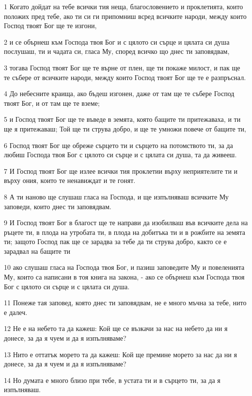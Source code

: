 \par 1 Когато дойдат на тебе всички тия неща, благословението и проклетията, които положих пред тебе, ако ти си ги припомниш всред всичките народи, между които Господ твоят Бог ще те изгони,
\par 2 и се обърнеш към Господа твоя Бог и с цялото си сърце и цялата си душа послушаш, ти и чадата си, гласа Му, според всичко що днес ти заповядвам,
\par 3 тогава Господ твоят Бог ще те върне от плен, ще ти покаже милост, и пак ще те събере от всичките народи, между които Господ твоят Бог ще те е разпръснал.
\par 4 До небесните краища, ако бъдеш изгонен, даже от там ще те събере Господ твоят Бог, и от там ще те вземе;
\par 5 и Господ твоят Бог ще те въведе в земята, която бащите ти притежаваха, и ти ще я притежаваш; Той ще ти струва добро, и ще те умножи повече от бащите ти,
\par 6 Господ твоят Бог ще обреже сърцето ти и сърцето на потомството ти, за да любиш Господа твоя Бог с цялото си сърце и с цялата си душа, та да живееш.
\par 7 И Господ твоят Бог ще излее всички тия проклетии върху неприятелите ти и върху ония, които те ненавиждат и те гонят.
\par 8 А ти наново ще слушаш гласа на Господа, и ще изпълняваш всичките Му заповеди, които днес ти заповядвам.
\par 9 И Господ твоят Бог в благост ще те направи да изобилваш във всичките дела на ръцете ти, в плода на утробата ти, в плода на добитъка ти и в рожбите на земята ти; защото Господ пак ще се зарадва за тебе да ти струва добро, както се е зарадвал на бащите ти
\par 10 ако слушаш гласа на Господа твоя Бог, и пазиш заповедите Му и повеленията Му, които са написани в тоя книга на закона, - ако се обърнеш към Господа твоя Бог с цялото си сърце и с цялата си душа.
\par 11 Понеже тая заповед, която днес ти заповядвам, не е много мъчна за тебе, нито е далеч.
\par 12 Не е на небето та да кажеш: Кой ще се възкачи за нас на небето да ни я донесе, за да я чуем и да я изпълняваме?
\par 13 Нито е оттатък морето та да кажеш: Кой ще премине морето за нас да ни я донесе, за да я чуем и да я изпълняваме?
\par 14 Но думата е много близо при тебе, в устата ти и в сърцето ти, за да я изпълняваш.
